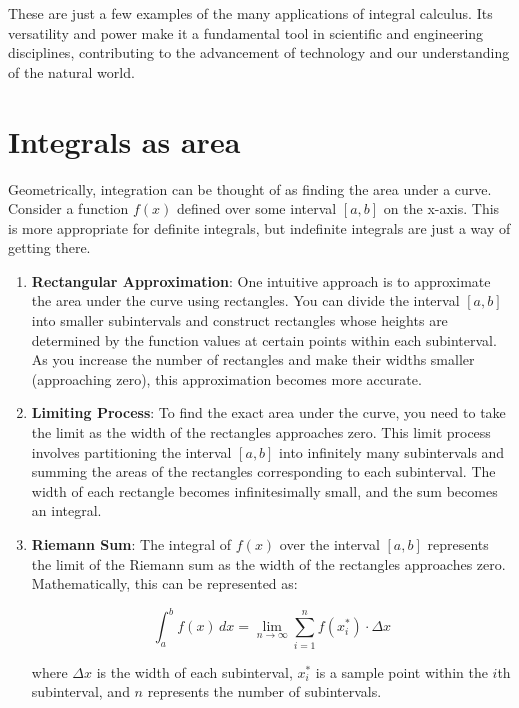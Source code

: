 These are just a few examples of the many applications of integral calculus. Its versatility and power make it a fundamental tool in scientific and engineering disciplines, contributing to the advancement of technology and our understanding of the natural world.


\section{Integrals as area}

Geometrically, integration can be thought of as finding the area under a curve. Consider a function \( f(x) \) defined over some interval \([a, b]\) on the x-axis. This is more appropriate for definite integrals, but indefinite integrals are just a way of getting there. 

\begin{enumerate}
    \item \textbf{Rectangular Approximation}: One intuitive approach is to approximate the area under the curve using rectangles. You can divide the interval \([a, b]\) into smaller subintervals and construct rectangles whose heights are determined by the function values at certain points within each subinterval. As you increase the number of rectangles and make their widths smaller (approaching zero), this approximation becomes more accurate.
    
    \item \textbf{Limiting Process}: To find the exact area under the curve, you need to take the limit as the width of the rectangles approaches zero. This limit process involves partitioning the interval \([a, b]\) into infinitely many subintervals and summing the areas of the rectangles corresponding to each subinterval. The width of each rectangle becomes infinitesimally small, and the sum becomes an integral.
    
    \item \textbf{Riemann Sum}: The integral of \( f(x) \) over the interval \([a, b]\) represents the limit of the Riemann sum as the width of the rectangles approaches zero. Mathematically, this can be represented as:
    
    \[ \int_{a}^{b} f(x) \, dx = \lim_{n \to \infty} \sum_{i=1}^{n} f(x_i^*) \cdot \Delta x \]
    
    where \( \Delta x \) is the width of each subinterval, \( x_i^* \) is a sample point within the \( i \)th subinterval, and \( n \) represents the number of subintervals.
    

\end{enumerate}

